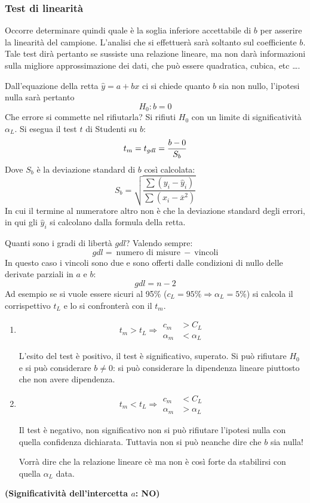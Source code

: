 \documentclass[a4paper, 15pt]{article}
\begin{document}
\subsubsection{Test di linearità}
\begin{adjustwidth}{2in}{}		
	Occorre determinare quindi quale è la soglia inferiore accettabile di $ b $ per asserire la linearità
	del campione. L'analisi che si effettuerà sarà soltanto sul coefficiente $b$. Tale test dirà pertanto se sussiste una relazione lineare, ma non darà informazioni sulla migliore approssimazione dei dati, che può essere quadratica, cubica, etc \dots. \newline 
	
	Dall'equazione della retta $\hat{y} = a + bx$ ci si chiede quanto $b$ sia non nullo, l'ipotesi nulla sarà pertanto \[H_0: b=0\]	
	Che errore si commette nel rifiutarla? Si rifiuti $H_0$ con un limite di significatività $\alpha_L$. Si esegua il test $t$ di Studenti su $b$: 
	\[t_m = t_{gdl} = {b-0\over S_b}\]
	Dove $S_b$ è la deviazione standard di $b$ così calcolata:
	\[S_b = \sqrt{\dfrac{\sum(y_i - \hat{y}_i)}{\sum(x_i-\overline{x}^2)}}\]
	In cui il termine al numeratore altro non è che la deviazione standard degli errori, in qui gli $ \hat{y}_i $ si calcolano dalla formula della retta. \newline 
	
	Quanti sono i gradi di libertà $gdl$? Valendo sempre:
	\[gdl = ~ \text{numero di misure} ~ - ~ \text{vincoli}\]
	In questo caso i vincoli sono due e sono offerti dalle condizioni di nullo delle derivate parziali in $a$ e $b$: 
	\[gdl = n - 2\]
	Ad esempio se si vuole essere sicuri al 95\% ($c_L = 95\% \Rightarrow\alpha_L = 5\%$) si calcola il corrispettivo $t_L$ e lo si confronterà con il $t_m$.
	
	\begin{enumerate}
		\item \[t_m>t_L \Rightarrow \begin{aligned}
			c_m&>C_L \\
			\alpha_m&<\alpha_L
		\end{aligned}\]
		
		L'esito del test è positivo, il test è significativo, superato. Si può rifiutare $H_0$ e si può considerare $b\ne0$: si può considerare la dipendenza lineare piuttosto che non avere dipendenza. 
		
		\item \[t_m<t_L \Rightarrow \begin{aligned}
			c_m&<C_L \\
			\alpha_m&>\alpha_L
		\end{aligned}\]
		
		Il test è negativo, non significativo non si può rifiutare l'ipotesi nulla con quella confidenza dichiarata. Tuttavia non si può neanche dire che $b$ sia nulla! 
		
		Vorrà dire che la relazione lineare cè ma non è così forte da stabilirsi con quella $\alpha_L$ data.
	\end{enumerate}
	\textbf{(Significatività dell’intercetta $ a $: NO) } 
\end{adjustwidth}
\newpage
\end{document}
